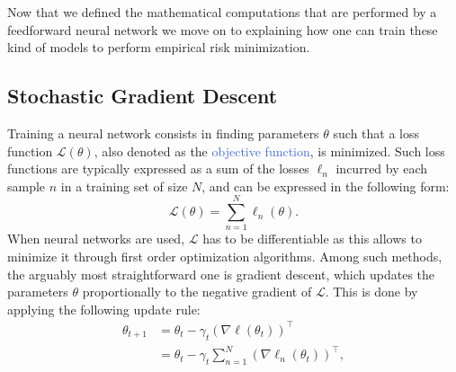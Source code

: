 Now that we defined the mathematical computations that are performed by a feedforward neural network we move on to explaining how one can train these kind of models to perform empirical risk minimization.

\subsection{Stochastic Gradient Descent}
\label{sec:sgd}

Training a neural network consists in finding parameters $\theta$ such that a loss function $\mathscr{L}(\theta)$, also denoted as the \textcolor{RoyalBlue}{objective function}, is minimized. Such loss functions are typically expressed as a sum of the losses $\ell_n$ incurred by each sample $n$ in a training set of size $N$, and can be expressed in the following form:
\begin{equation}
	\mathscr{L}(\theta) = \sum_{n=1}^{N}\ell_n(\theta).
	\label{eq:sum_of_losses}
\end{equation}
When neural networks are used, $\mathscr{L}$ has to be differentiable as this allows to minimize it through first order optimization algorithms. Among such methods, the arguably most straightforward one is gradient descent, which updates the parameters $\theta$ proportionally to the negative gradient of $\mathscr{L}$. This is done by applying the following update rule:
\begin{equation}
	\begin{split}
	\theta_{t+1} & = \theta_t - \gamma_t(\nabla\ell(\theta_t))^{\intercal} \\ 
	& = \theta_t - \gamma_t \sum_{n=1}^{N}(\nabla \ell_n(\theta_t))^{\intercal},
	\end{split}
	\label{eq:gradient_descent}
\end{equation}
